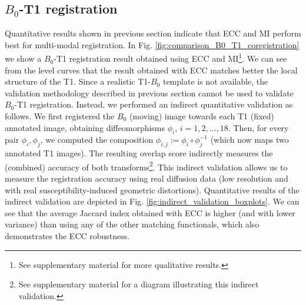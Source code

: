 \subsection{$B_{0}$-T1 registration}
Quantitative results shown in previous section indicate that ECC and MI perform best for multi-modal registration. In Fig. \ref{fig:comparison_B0_T1_coregistration} we show a $B_{0}$-T1 registration result obtained using ECC and MI\footnote{See supplementary material for more qualitative results.}. We can see from the level curves that the result obtained with ECC matches better the local structure of the T1. Since a realistic T1-$B_{0}$ template is not available, the validation methodology described in previous section cannot be used to validate $B_{0}$-T1 registration. Instead, we performed an indirect quantitative validation as follows. We first registered the $B_{0}$ (moving) image towards each T1 (fixed) annotated image, obtaining diffeomorphisms $\phi_{i}$, $i=1,2,...,18$. Then, for every pair $\phi_{i}, \phi_{j}$, we computed the composition $\phi_{i,j}:=\phi_{i}\circ \phi_{j}^{-1}$ (which now maps two annotated T1 images). The resulting overlap score indirectly measures the (combined) accuracy of both transforms\footnote{See supplementary material for a diagram illustrating this indirect validation.}. This indirect validation allows us to measure the registration accuracy using real diffusion data (low resolution and with real susceptibility-induced geometric distortions). Quantitative results of the indirect validation are depicted in Fig. \ref{fig:indirect_validation_boxplots}. We can see that the average Jaccard index obtained with ECC is higher (and with lower variance) than using any of the other matching functionals, which also demonstrates the ECC robustness.


